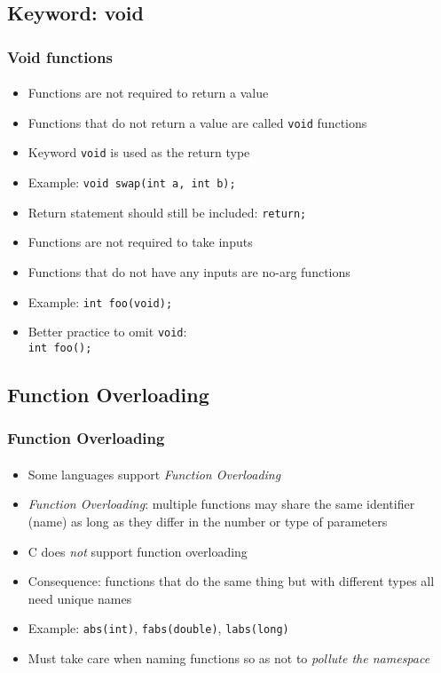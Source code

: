 \documentclass[]{beamer}
\begin{document}
\subsection{Keyword: void}


\begin{frame}[fragile]
    \frametitle{Void functions}
    \framesubtitle{}

\begin{itemize}[<+->]
  \item Functions are not required to return a value
  \item Functions that do not return a value are called \texttt{void} functions
  \item Keyword \texttt{void} is used as the return type
  \item Example: \texttt{void swap(int a, int b);}
  \item Return statement should still be included: \texttt{return;}
  \item Functions are not required to take inputs
  \item Functions that do not have any inputs are no-arg functions
  \item Example: \texttt{int foo(void);}
  \item Better practice to omit \texttt{void}: \\
  \texttt{int foo();}
\end{itemize}

\end{frame}

\subsection{Function Overloading}

\begin{frame}[fragile]
  \frametitle{Function Overloading}
  \framesubtitle{}

\begin{itemize}[<+->]
  \item Some languages support \emph{Function Overloading}
  \item \emph{Function Overloading}: multiple functions may share 
  the same identifier (name) as long as they differ in the number or
  type of parameters
  \item C does \emph{not} support function overloading
  \item Consequence: functions that do the same thing but with different
  types all need unique names
  \item Example: \texttt{abs(int)}, \texttt{fabs(double)}, 
  \texttt{labs(long)}
  \item Must take care when naming functions so as not to \emph{pollute the namespace}
\end{itemize}

\end{frame}
    
\end{document}
